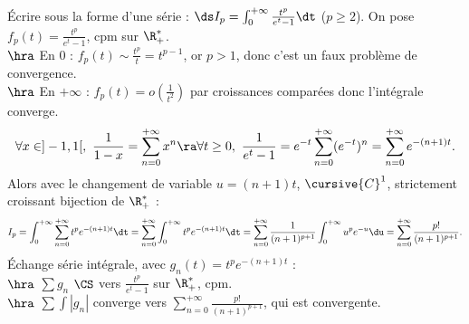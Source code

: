 \documentclass[french, 11pt]{article}
\begin{document}
\begin{question}{}{}
    Écrire sous la forme d'une série : $\ds I_p = \int_0^{+\infty}\frac{t^p}{e^t-1}\dt$ ($p\geq 2$).
    \tcblower
    On pose $f_p(t)=\frac{t^p}{e^t-1}$, cpm sur $\R_+^*$.\\
    $\hra$ En 0 : $f_p(t) \sim \frac{t^p}{t} = t^{p-1}$, or $p>1$, donc c'est un faux problème de convergence.\\
    $\hra$ En $+\infty$ : $f_p(t)=o\left( \frac{1}{t^2} \right)$ par croissances comparées donc l'intégrale converge.
    \begin{equation*}
        \forall x \in ]-1,1[, ~ \frac{1}{1-x} = \sum_{n=0}^{+\infty} x^n \ra \forall t \geq 0, ~ \frac{1}{e^t - 1} = e^{-t}\sum_{n=0}^{+\infty} (e^{-t})^n = \sum_{n=0}^{+\infty} e^{-(n+1)t}.
    \end{equation*} 
    Alors avec le changement de variable $u=(n+1)t$, $\cursive{C}^1$, strictement croissant bijection de $\R_+^*$ :
    \begin{equation*}
        I_p = \int_0^{+\infty} \sum_{n=0}^{+\infty} t^p e^{-(n+1)t}\dt = \sum_{n=0}^{+\infty}\int_0^{+\infty} t^p e^{-(n+1)t}\dt= \sum_{n=0}^{+\infty}\frac{1}{(n+1)^{p+1}}\int_0^{+\infty} u^p e^{-u}\du = \sum_{n=0}^{+\infty}\frac{p!}{(n+1)^{p+1}}.
    \end{equation*}
    Échange série intégrale, avec $g_n(t)=t^p e^{-(n+1)t}$ :\\
    $\hra$ $\sum g_n$ $\CS$ vers $\frac{t^p}{e^t-1}$ sur $\R_+^*$, cpm.\\
    $\hra$ $\sum \int |g_n|$ converge vers $\sum_{n=0}^{+\infty}\frac{p!}{(n+1)^{p+1}}$, qui est convergente.
\end{question}

\pagebreak
\end{document}
